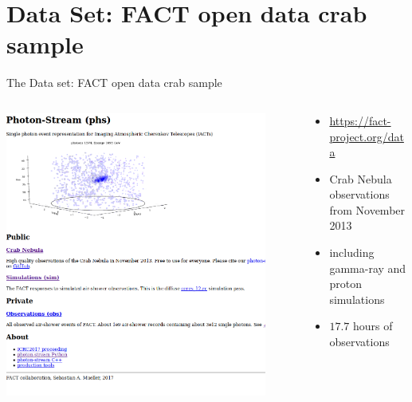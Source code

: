 \section{Data Set: FACT open data crab sample}

\begin{frame}[t]{The Data set: FACT open data crab sample}
\begin{columns}[onlytextwidth]
    \begin{column}{0.475\textwidth}
        \includegraphics[width=0.9\textwidth]{fig/open.png}
    \end{column}
    \begin{column}{0.475\textwidth}
    \vspace*{\fill}
        \begin{itemize}
            \item \url{https://fact-project.org/data}
            \item Crab Nebula observations from November 2013
            \item including gamma-ray and proton simulations
            \item $17.7$ hours of observations
        \end{itemize}
    \end{column}
\end{columns}
\end{frame}

